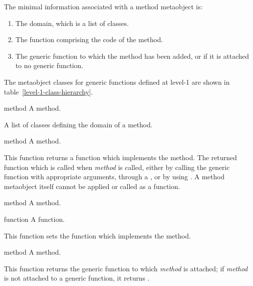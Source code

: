 \begin{optDefinition}
The minimal information associated with a method metaobject is:

\begin{enumerate}
    \item The domain, which is a list of classes.
    \item The function comprising the code of the method.
    \item The generic function to which the method has been added, or \nil\/ if
    it is attached to no generic function.
\end{enumerate}
%
The metaobject classes for generic functions defined at level-1 are
shown in table~\ref{level-1-class-hierarchy}.

%
\begin{arguments}
    \item[method] A method.
\end{arguments}
%
\result%
A list of classes defining the domain of a method.

%
\begin{arguments}
    \item[method] A method.
\end{arguments}
%
\result%
This function returns a function which implements the method.  The returned
function which is called when {\em method} is called, either by calling the
generic function with appropriate arguments, through a
, or by using .  A method
metaobject itself cannot be applied or called as a function.

%
\begin{arguments}
    \item[method] A method.
    \item[function] A function.
\end{arguments}
%
\result%
This function sets the function which implements the method.

%
\begin{arguments}
    \item[method] A method.
\end{arguments}
%
\result%
This function returns the generic function to which {\em method} is attached; if
{\em method} is not attached to a generic function, it returns \nil.
\end{optDefinition}

